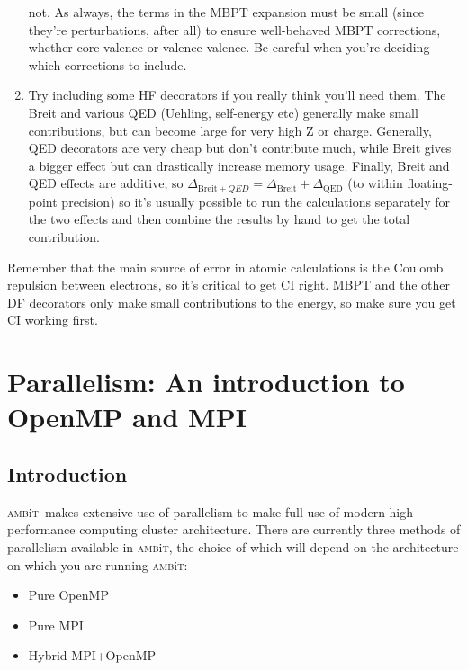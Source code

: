 \documentclass{report}
\newcommand{\ambit}{\textsc{amb}{\footnotesize i}\textsc{t}}
\begin{document}
\begin{enumerate}
  not. As always, the terms in the MBPT expansion must be small (since they're perturbations, after all)
  to ensure well-behaved MBPT corrections, whether core-valence or valence-valence. Be careful when
  you're deciding which corrections to include.
\item
  Try including some HF decorators if you really think you'll need them.
  The Breit and various QED (Uehling, self-energy etc) generally make
  small contributions, but can become large for very high Z or charge.
  Generally, QED decorators are very cheap but don't contribute much,
  while Breit gives a bigger effect but can drastically increase memory
  usage. Finally, Breit and QED effects are additive, so $\Delta_{\mathrm{Breit} +
  QED} = \Delta_{\mathrm{Breit}} + \Delta_{\mathrm{QED}}$ (to within floating-point precision) so it's
  usually possible to run the calculations separately for the two effects and then combine the results 
  by hand to get the total contribution.
\end{enumerate}

Remember that the main source of error in atomic calculations is the Coulomb repulsion between
electrons, so it's critical to get CI right. MBPT and the other DF decorators only make small 
contributions to the energy, so make sure you get CI working first.


\chapter{Parallelism: An introduction to OpenMP and MPI}
\label{chap:HPC}

\section{Introduction}
\ambit\ makes extensive use of parallelism to make full use of modern high-performance computing cluster
architecture. There are currently three methods of parallelism available in \ambit, the choice of which
will depend on the architecture on which you are running \ambit:

\begin{itemize}
    \item Pure OpenMP
    \item Pure MPI
    \item Hybrid MPI+OpenMP
\end{itemize}
\end{document}
